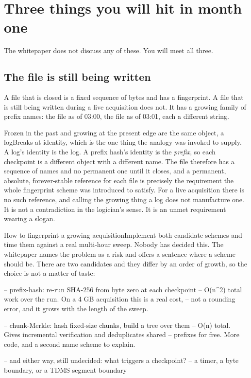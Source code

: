 \section{Three things you will hit in month one}

The whitepaper does not discuss any of these. You will meet all three.

\subsection{The file is still being written}

A \labFileFormat{} file that is closed is a fixed sequence of bytes and has a fingerprint. A file that is still being written during a live acquisition does not. It has a growing family of prefix names: the file as of 03:00, the file as of 03:01, each a different string.

\begin{Analogy}{Frozen in the past and growing at the present edge are the same object, a log}{Breaks at identity, which is the one thing the analogy was invoked to supply.}
A log's identity is the log. A prefix hash's identity is the \emph{prefix}, so each checkpoint is a different object with a different name. The file therefore has a sequence of names and no permanent one until it closes, and a permanent, absolute, forever-stable reference for each file is precisely the requirement the whole fingerprint scheme was introduced to satisfy. For a live acquisition there is no such reference, and calling the growing thing a log does not manufacture one. It is not a contradiction in the logician's sense. It is an unmet requirement wearing a slogan.
\end{Analogy}

\begin{Open}{How to fingerprint a growing acquisition}{Implement both candidate schemes and time them against a real multi-hour \labColdSystemShort{} sweep.}
Nobody has decided this. The whitepaper names the problem as a risk and offers a sentence where a scheme should be. There are two candidates and they differ by an order of growth, so the choice is not a matter of taste:

\begin{Check}
-- prefix-hash: re-run SHA-256 from byte zero at each checkpoint
--   O(n^2) total work over the run. On a 4 GB acquisition this is a real cost,
--   not a rounding error, and it grows with the length of the sweep.

-- chunk-Merkle: hash fixed-size chunks, build a tree over them
--   O(n) total. Gives incremental verification and deduplicates shared
--   prefixes for free. More code, and a second name scheme to explain.

-- and either way, still undecided: what triggers a checkpoint?
--   a timer, a byte boundary, or a TDMS segment boundary
\end{Check}
\end{Open}

